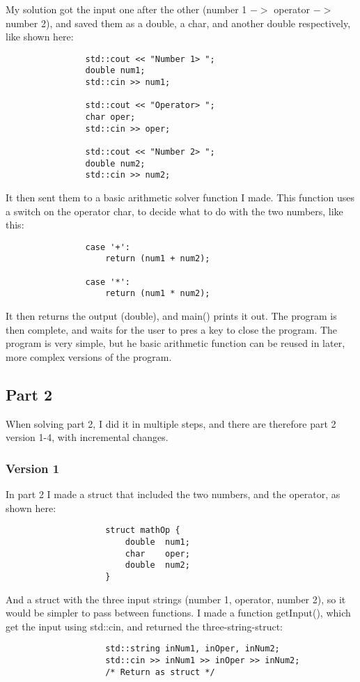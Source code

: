 \documentclass{article}
\begin{document}
			My solution got the input one after the other (number 1 $->$ operator $->$ number 2), and saved them as a double, a char, and another double respectively, like shown here:
			\begin{lstlisting}
				std::cout << "Number 1> ";
				double num1;
				std::cin >> num1;
				
				std::cout << "Operator> ";
				char oper;
				std::cin >> oper;
				
				std::cout << "Number 2> ";
				double num2;
				std::cin >> num2;
			\end{lstlisting}
			
			It then sent them to a basic arithmetic solver function I made. This function uses a switch on the operator char, to decide what to do with the two numbers, like this:
			\begin{lstlisting}
				case '+':
					return (num1 + num2);
				
				case '*':
					return (num1 * num2);
			\end{lstlisting}
			
			It then returns the output (double), and main() prints it out. The program is then complete, and waits for the user to pres a key to close the program. The program is very simple, but he basic arithmetic function can be reused in later, more complex versions of the program.
		
		
		\subsection{Part 2}
			When solving part 2, I did it in multiple steps, and there are therefore part 2 version 1-4, with incremental changes.
			
			\subsubsection{Version 1}
				In part 2 I made a struct that included the two numbers, and the operator, as shown here:
				\begin{lstlisting}
					struct mathOp {
						double	num1;
						char	oper;
						double	num2;
					}
				\end{lstlisting}
				
				And a struct with the three input strings (number 1, operator, number 2), so it would be simpler to pass between functions. I made a function getInput(), which get the input using std::cin, and returned the three-string-struct:
				\begin{lstlisting}
					std::string inNum1, inOper, inNum2;
					std::cin >> inNum1 >> inOper >> inNum2;
					/* Return as struct */
				\end{lstlisting}
				
\end{document}
